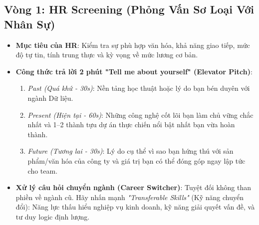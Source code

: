 \subsection{Vòng 1: HR Screening (Phỏng Vấn Sơ Loại Với Nhân Sự)}
\begin{itemize}
    \item \textbf{Mục tiêu của HR}: Kiểm tra sự phù hợp văn hóa, khả năng giao tiếp, mức độ tự tin, tính trung thực và kỳ vọng về mức lương cơ bản.
    \item \textbf{Công thức trả lời 2 phút "Tell me about yourself" (Elevator Pitch)}:
    \begin{enumerate}
        \item \textit{Past (Quá khứ - 30s)}: Nền tảng học thuật hoặc lý do bạn bén duyên với ngành Dữ liệu.
        \item \textit{Present (Hiện tại - 60s)}: Những công nghệ cốt lõi bạn làm chủ vững chắc nhất và 1--2 thành tựu dự án thực chiến nổi bật nhất bạn vừa hoàn thành.
        \item \textit{Future (Tương lai - 30s)}: Lý do cụ thể vì sao bạn hứng thú với sản phẩm/văn hóa của công ty và giá trị bạn có thể đóng góp ngay lập tức cho team.
    \end{enumerate}
    \item \textbf{Xử lý câu hỏi chuyển ngành (Career Switcher)}: Tuyệt đối không than phiền về ngành cũ. Hãy nhấn mạnh \textit{"Transferable Skills"} (Kỹ năng chuyển đổi): Năng lực thấu hiểu nghiệp vụ kinh doanh, kỹ năng giải quyết vấn đề, và tư duy logic định lượng.
\end{itemize}

